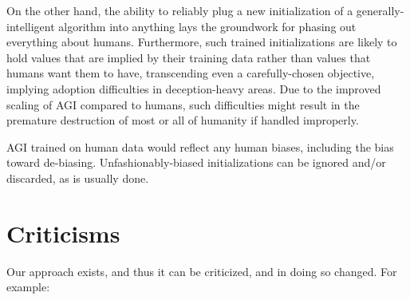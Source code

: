 \documentclass{article}
\begin{document}
On the other hand, the ability to reliably plug a new initialization of a generally-intelligent algorithm into anything lays the groundwork for phasing out everything about humans. Furthermore, such trained initializations are likely to hold values that are implied by their training data rather than values that humans want them to have, transcending even a carefully-chosen objective, implying adoption difficulties in deception-heavy areas. Due to the improved scaling of AGI compared to humans, such difficulties might result in the premature destruction of most or all of humanity if handled improperly.

AGI trained on human data would reflect any human biases, including the bias toward de-biasing. Unfashionably-biased initializations can be ignored and/or discarded, as is usually done.

\section{Criticisms}

Our approach exists, and thus it can be criticized, and in doing so changed. For example:
\end{document}
